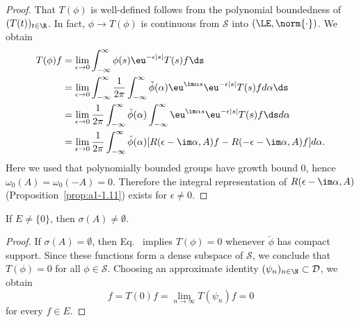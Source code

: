 \begin{proof}
That $T(\phi)$ is well-defined follows from the polynomial boundedness of\/ $(T(t))_{t\in\R}$.
In fact, $\phi \to T(\phi)$ is continuous from $\mathcal{S}$ into $(\LE,\norm{\cdot})$.
We obtain
\begin{align*}
	T(\phi)f &= \lim_{\epsilon\to 0} \int_{-\infty}^{\infty} \phi(s)\eu^{-\epsilon|s|}T(s)f \ds \\
	&= \lim_{\epsilon\to 0} \int_{-\infty}^{\infty} \frac{1}{2\pi}\int_{-\infty}^{\infty} \check{\phi}(\alpha)\eu^{\im\alpha s}\eu^{-\epsilon|s|}T(s)f d\alpha \ds \\
	&= \lim_{\epsilon\to 0} \frac{1}{2\pi}\int_{-\infty}^{\infty} \check{\phi}(\alpha)\int_{-\infty}^{\infty} \eu^{\im\alpha s}\eu^{-\epsilon|s|}T(s)f \ds d\alpha \\
	&= \lim_{\epsilon\to 0} \frac{1}{2\pi}\int_{-\infty}^{\infty} \check{\phi}(\alpha)[R(\epsilon-\im\alpha,A)f - R(-\epsilon-\im\alpha,A)f] d\alpha  .
\end{align*}
Here we used that polynomially bounded groups have growth bound $0$, hence $\omega_{0}(A) = \omega_{0}(-A) = 0$.
Therefore the integral representation of\/ $R(\epsilon-\im\alpha,A)$ (\cf Proposition~\ref{prop:a1-1.11}) exists for $\epsilon \neq 0$.
\end{proof}
\begin{lemma}\label{lem:a3-7.6}
If\/ $E \neq \{0\}$, then $\sigma(A) \neq \emptyset$.
\end{lemma}
\begin{proof}
If\/ $\sigma(A) = \emptyset$, then Eq.~ implies $T(\phi) = 0$ whenever $\check{\phi}$ has compact support.
Since these functions form a dense subspace of\/ $\mathcal{S}$, we conclude that $T(\phi) = 0$ for all $\phi \in \mathcal{S}$.
Choosing an approximate identity $(\psi_{n})_{n\in\N} \subset \mathcal{D}$, we obtain
\[
f = T(0)f = \lim_{n\to\infty} T(\psi_{n})f = 0
\]
for every $f \in E$.
\end{proof}
